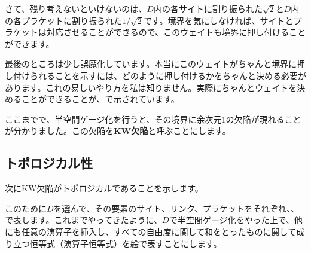 \documentclass[report,paper=a4, fontsize=12pt, line_length=16cm, number_of_lines=33,dvipdfmx]{jlreq}
\newcommand{\kyou}[1]{{\sffamily \bfseries #1}}
\numberwithin{equation}{chapter}
\begin{document}
さて、残り考えないといけないのは、$D$内の各サイトに割り振られた$\sqrt{2}$と$D$内の各プラケットに割り振られた$1/\sqrt{2}$です。境界を気にしなければ、サイトとプラケットは対応させることができるので、このウェイトも境界に押し付けることができます。

最後のところは少し誤魔化しています。本当にこのウェイトがちゃんと境界に押し付けられることを示すには、どのように押し付けるかをちゃんと決める必要があります。これの易しいやり方を私は知りません。実際にちゃんとウェイトを決めることができることが、\cite{Aasen:2016dop}で示されています。

ここまでで、半空間ゲージ化を行うと、その境界に余次元1の欠陥が現れることが分かりました。この欠陥を\kyou{KW欠陥}と呼ぶことにします。

\subsection{トポロジカル性}\label{sec:KWtopologicalness}
次にKW欠陥がトポロジカルであることを示します。

このために$D$を選んで、その要素のサイト、リンク、プラケットをそれぞれ、、 で表します。これまでやってきたように、$D$で半空間ゲージ化をやった上で、他にも任意の演算子を挿入し、すべての自由度に関して和をとったものに関して成り立つ恒等式（演算子恒等式）を絵で表すことにします。
\end{document}
